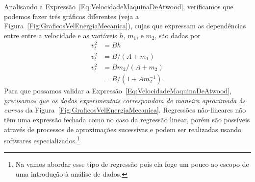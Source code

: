 Analisando a Expressão~\eqref{Eq:VelocidadeMaquinaDeAtwood}, verificamos que podemos fazer três gráficos diferentes (veja a Figura~\ref{Fig:GraficosVelEnergiaMecanica}), cujas que expressam as dependências entre entre a velocidade e as variáveis $h$, $m_1$, e $m_2$, são dadas por
\begin{align}
    v_t^2 &= B h \\
    v_t^2 &= B / (A + m_1) \\
    v_t^2 &= B m_2 / (A + m_2) \\
    &= B / (1 + A m_2^{-1}).
\end{align}
%
Para que possamos validar a Expressão~\eqref{Eq:VelocidadeMaquinaDeAtwood}, \emph{precisamos que os dados experimentais correspondam de maneira aproximada às curvas} da Figura~\ref{Fig:GraficosVelEnergiaMecanica}. Regressões não-lineares não têm uma expressão fechada como no caso da regressão linear, porém são possíveis através de processos de aproximações sucessivas e podem ser realizadas usando softwares especializados.\footnote[][-2cm]{Na vamos abordar esse tipo de regressão pois ela foge um pouco ao escopo de uma introdução à análise de dados.} 
\begin{figure*}[!h]
\caption{Curvas que expressão a dependência da velocidade ao quadrado com $h$, $m_1$, e $m_2$ para o sistema retratado na Figura~\label{Fig:MaquinaAtwoodHorizEnergia}.\label{Fig:GraficosVelEnergiaMecanica}}
\end{figure*}

